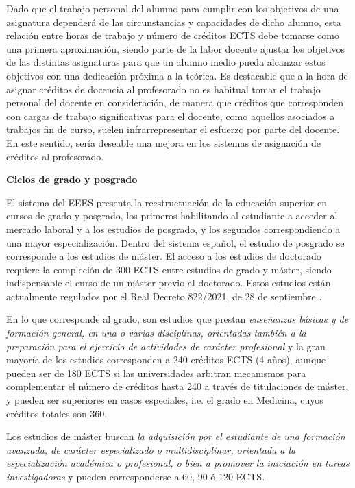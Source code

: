 \documentclass[a4paper,12pt,twoside]{article}
\begin{document}
Dado que el trabajo personal del alumno para cumplir con los objetivos de una asignatura dependerá de las circunstancias y capacidades de dicho alumno, esta relación entre horas de trabajo y número de créditos ECTS debe tomarse como una primera aproximación, siendo parte de la labor docente ajustar los objetivos de las distintas asignaturas para que un alumno medio pueda alcanzar estos objetivos con una dedicación próxima a la teórica. Es destacable que a la hora de asignar créditos de docencia al profesorado no es habitual tomar el trabajo personal del docente en consideración, de manera que créditos que corresponden con cargas de trabajo significativas para el docente, como aquellos asociados a trabajos fin de curso, suelen infrarrepresentar el esfuerzo por parte del docente. En este sentido, sería deseable una mejora en los sistemas de asignación de créditos al profesorado.

\textbf{Ciclos de grado y posgrado}

El sistema del EEES presenta la reestructuación de la educación superior en cursos de grado y posgrado, los primeros habilitando al estudiante a acceder al mercado laboral y a los estudios de posgrado, y los segundos correspondiendo a una mayor especialización. Dentro del sistema español, el estudio de posgrado se corresponde a los estudios de máster. El acceso a los estudios de doctorado requiere la compleción de 300 ECTS entre estudios de grado y máster, siendo indispensable el curso de un máster previo al doctorado. Estos estudios están actualmente regulados por el Real Decreto 822/2021, de 28 de septiembre \cite{dec_master}.

En lo que corresponde al grado, son estudios que prestan \textit{enseñanzas básicas y de formación general, en una o varias disciplinas, orientadas
también a la preparación para el ejercicio de actividades de carácter profesional} y la gran mayoría de los estudios corresponden a 240 créditos ECTS (4 años), aunque pueden ser de 180 ECTS si las universidades arbitran mecanismos para complementar el número de créditos hasta 240 a través de titulaciones de máster, y pueden ser superiores en casos especiales, i.e. el grado en Medicina, cuyos créditos totales son 360.

Los estudios de máster buscan \textit{la adquisición por el estudiante de una formación avanzada, de carácter
especializado o multidisciplinar, orientada a la especialización académica o profesional, o
bien a promover la iniciación en tareas investigadoras} y pueden corresponderse a 60, 90 ó 120 ECTS.
\end{document}
